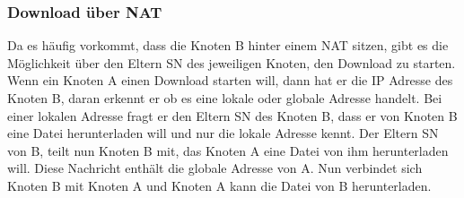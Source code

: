 \subsubsection{Download über NAT}
\label{subsubsec:dnat}
Da es häufig vorkommt, dass die Knoten B hinter einem NAT sitzen, gibt es die Möglichkeit über den Eltern SN des jeweiligen Knoten, den Download zu starten.
Wenn ein Knoten A einen Download starten will, dann hat er die IP Adresse des Knoten B, daran erkennt er ob es eine lokale oder globale Adresse handelt.
Bei einer lokalen Adresse fragt er den Eltern SN des Knoten B, dass er von Knoten B eine Datei herunterladen will und nur die lokale Adresse kennt.
Der Eltern SN von B, teilt nun Knoten B mit, das Knoten A eine Datei von ihm herunterladen will.
Diese Nachricht enthält die globale Adresse von A.
Nun verbindet sich Knoten B mit Knoten A und Knoten A kann die Datei von B herunterladen.